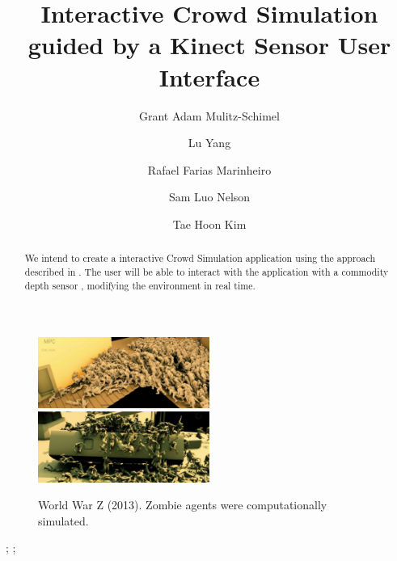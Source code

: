 \documentclass[conference, 12pt]{acmsiggraph}
\title{Interactive Crowd Simulation guided by a Kinect Sensor User Interface}
\author{Grant Adam Mulitz-Schimel \and Lu Yang \and Rafael Farias Marinheiro \and Sam Luo Nelson \and Tae Hoon Kim}
\affiliation{Cornell University\thanks{\{gam244, ly77, rf356, sln58, tk536\}@cornell.edu}}
\begin{document}

\maketitle

\begin{abstract}

We intend to create a interactive Crowd Simulation application using the approach described in \cite{kim2012interactive}. The user will be able to interact with the application with a commodity depth sensor \cite{Zhang:2012:MKS:2225053.2225203}, modifying the environment in real time.

\end{abstract}

\begin{figure}[Ht!]
  \centering
    \includegraphics[width=0.5\textwidth]{images/mpc3.jpg}
    \includegraphics[width=0.5\textwidth]{images/mpc2.jpg}
	\caption{World War Z (2013). Zombie agents were computationally simulated.}
	\label{fig:wwz}
\end{figure}


\begin{CRcatlist}
	;
	;
\end{CRcatlist}


\keywordlist
\end{document}
